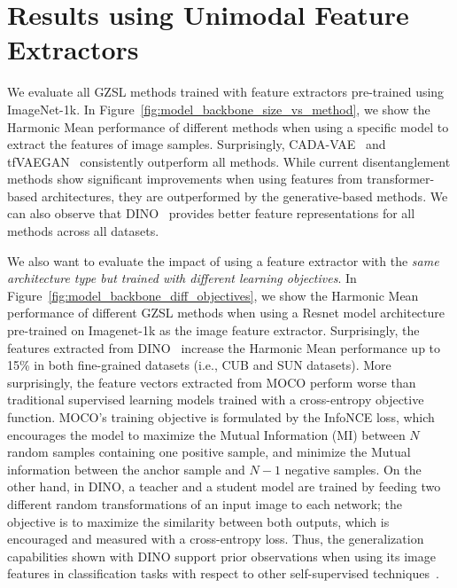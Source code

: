 



\section{Results using Unimodal Feature Extractors}
\label{sec:results_unimodal}

We evaluate all GZSL methods trained with feature extractors pre-trained using ImageNet-1k. In Figure~\ref{fig:model_backbone_size_vs_method}, we show the Harmonic Mean performance of different methods when using a specific model to extract the features of image samples. Surprisingly, CADA-VAE~\cite{CADA_VAE} and tfVAEGAN~\cite{tfvaegan} consistently outperform all methods. While current disentanglement methods show significant improvements when using features from transformer-based architectures, they are outperformed by the generative-based methods.
We can also observe that DINO~\cite{DINO} provides better
feature representations for all methods across all datasets.


We also want to evaluate the impact of using a feature extractor with the \textit{same architecture type but trained with different learning objectives}. In Figure~\ref{fig:model_backbone_diff_objectives}, we show the Harmonic Mean performance of
different GZSL methods when using a Resnet model architecture pre-trained on Imagenet-1k as the image feature extractor. Surprisingly, the features extracted from DINO~\cite{DINO} increase the Harmonic Mean performance up to 15\% in both fine-grained datasets (i.e., CUB and SUN datasets). More surprisingly, the feature vectors extracted from MOCO perform worse than traditional supervised learning models trained with a cross-entropy objective function. MOCO's training objective is formulated by the InfoNCE loss, which encourages the model to maximize the Mutual Information (MI) between $N$ random samples containing one positive sample, and minimize the Mutual information between the anchor sample and $N-1$ negative samples. 
On the other hand, in DINO, a teacher and a student model are trained by feeding two different random transformations of an input image to each network; the objective is to maximize the similarity between both outputs, which is encouraged and measured with a cross-entropy loss. 
Thus, the generalization capabilities shown with DINO support prior observations when using its image features in classification tasks with respect to other self-supervised techniques~\cite{DINO}.


